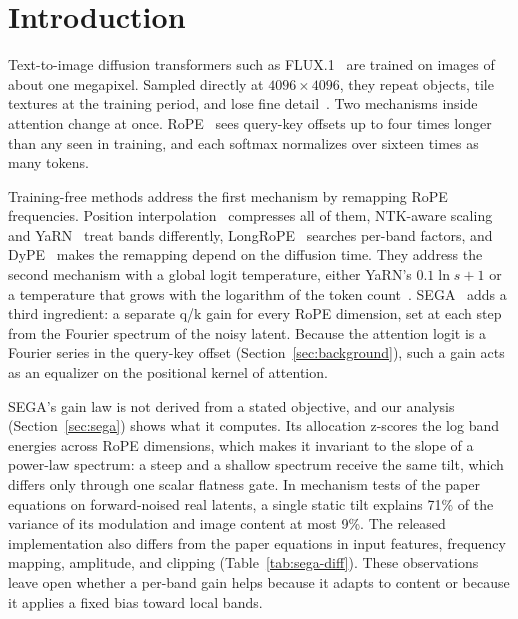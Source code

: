 \section{Introduction}
\label{sec:intro}

Text-to-image diffusion transformers such as FLUX.1~\citep{flux2024} are trained on images of about one megapixel. Sampled directly at $4096\times4096$, they repeat objects, tile textures at the training period, and lose fine detail~\citep{he2024scalecrafter,du2024demofusion,zhang2025diffusion4k}. Two mechanisms inside attention change at once. RoPE~\citep{su2024roformer} sees query-key offsets up to four times longer than any seen in training, and each softmax normalizes over sixteen times as many tokens.

Training-free methods address the first mechanism by remapping RoPE frequencies. Position interpolation~\citep{chen2023pi} compresses all of them, NTK-aware scaling and YaRN~\citep{peng2024yarn} treat bands differently, LongRoPE~\citep{ding2024longrope} searches per-band factors, and DyPE~\citep{issachar2025dype} makes the remapping depend on the diffusion time. They address the second mechanism with a global logit temperature, either YaRN's $0.1\ln s+1$ or a temperature that grows with the logarithm of the token count~\citep{jin2023training,nakanishi2025ssmax}. SEGA~\citep{sega2026} adds a third ingredient: a separate q/k gain for every RoPE dimension, set at each step from the Fourier spectrum of the noisy latent. Because the attention logit is a Fourier series in the query-key offset (Section~\ref{sec:background}), such a gain acts as an equalizer on the positional kernel of attention.

SEGA's gain law is not derived from a stated objective, and our analysis (Section~\ref{sec:sega}) shows what it computes. Its allocation z-scores the log band energies across RoPE dimensions, which makes it invariant to the slope of a power-law spectrum: a steep and a shallow spectrum receive the same tilt, which differs only through one scalar flatness gate. In mechanism tests of the paper equations on forward-noised real latents, a single static tilt explains 71\% of the variance of its modulation and image content at most 9\%. The released implementation also differs from the paper equations in input features, frequency mapping, amplitude, and clipping (Table~\ref{tab:sega-diff}). These observations leave open whether a per-band gain helps because it adapts to content or because it applies a fixed bias toward local bands.

